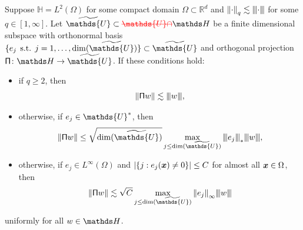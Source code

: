 \documentclass[smallextended]{svjour3}
\let\F\mathds\let\C\mathcal\newcommand{\R}{\F{R}}\newcommand{\A}{\tens{A}}
\newcommand{\norm}[1]{{\left\lVert #1 \right\rVert}}
\newcommand{\Norm}[1]{{\left\vert\kern-0.25ex\left\vert\kern-0.25ex\left\vert #1 \right\vert\kern-0.25ex\right\vert\kern-0.25ex\right\vert}}
\newcommand{\op}[1]{\operatorname{#1}}
\newcommand{\1}{\F{1}}
\DeclareMathOperator{\st}{\;s.t.\;}
\newcommand*{\varf}[1]{%
	\IfEqCase{#1}{%
		{0}{u}%
		{1}{v}%
		{2}{w}%
	}[u#1]%
}
\newcommand*{\spcf}[1]{%
	\IfEqCase{#1}{%
		{0}{\F{U}}%
		{1}{\F{V}}%
		{2}{\F{W}}%
	}[\F{U}#1]%
}
\newcommand*{\varx}[1]{%
	\IfEqCase{#1}{%
		{0}{x}%
		{1}{y}%
		{2}{z}%
		{3}{r}%
	}[x#1]%
}
\newcommand{\Domain}{\Omega}\newcommand{\domain}{\omega}
\newcommand*{\vvarx}[1]{\vec{\varx{#1}}}
\newcommand{\edit}[2]{{\ifmmode\text{\color{red}\sout{\ensuremath{#1}}}\else {\color{red} \sout{#1}}\fi} {\color{darkgreen} #2}}
\begin{document}
	\begin{lemma}\label{app:thm: generic a_U bound}
		Suppose $\F H= L^2(\Domain)$ for some compact domain $\Domain\subset\R^d$ and $\norm\cdot_q\lesssim \Norm\cdot$ for some $q\in[1,\infty]$. Let $\tilde{\spcf0}\subset \edit{\spcf0\cap}{}\F H$ be a finite dimensional subspace with orthonormal basis $\{e_j\st j=1,\ldots,\op{dim}(\tilde{\spcf0})\}\subset\tilde{\spcf0}$ and orthogonal projection $\tens{\Pi}\colon\F H\to\tilde{\spcf0}$. If these conditions hold:
		\begin{itemize}
			\item if $q\geq 2$, then $$\norm{\tens{\Pi}\varf2} \lesssim \Norm{\varf2}, $$
			\item otherwise, if $e_j\in \spcf0^*$, then
			\begin{equation}
				\norm{\tens{\Pi}\varf2} \leq \sqrt{\op{dim}(\tilde{\spcf0})}\max_{j\leq \op{dim}(\tilde{\spcf0})}\Norm{e_j}_*\Norm{\varf2},
			\end{equation}
			\item otherwise, if $e_j\in L^\infty(\Domain)$ and $ |\{j:e_j(\vvarx0)\neq 0\}|\leq C$ for almost all $\vvarx0\in\Domain$, then
			\begin{equation}
				\norm{\tens{\Pi}\varf2} \lesssim \sqrt C\max_{j\leq\op{dim}(\tilde{\spcf0})}\norm{e_j}_{\infty}\Norm{\varf2}
			\end{equation}
		\end{itemize}
		uniformly for all $\varf2\in \F H$.
	\end{lemma}
\end{document}
